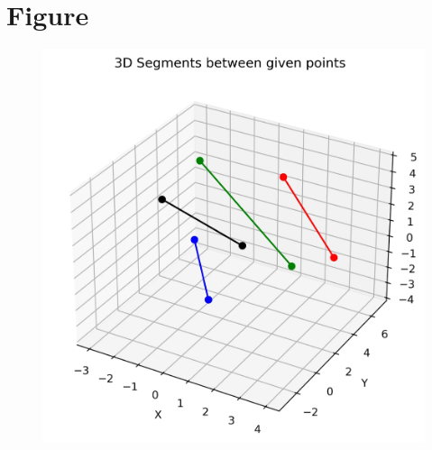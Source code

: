 \documentclass[journal,12pt,onecolumn]{IEEEtran}
\begin{document}
\section*{Figure}
\begin{center}
\begin{figure}[H]
    \centering
    \includegraphics[scale=0.4]{figs/Figure_1.png}
    \caption{}
    \label{fig:1}
\end{figure}
\end{center}
\end{document}
